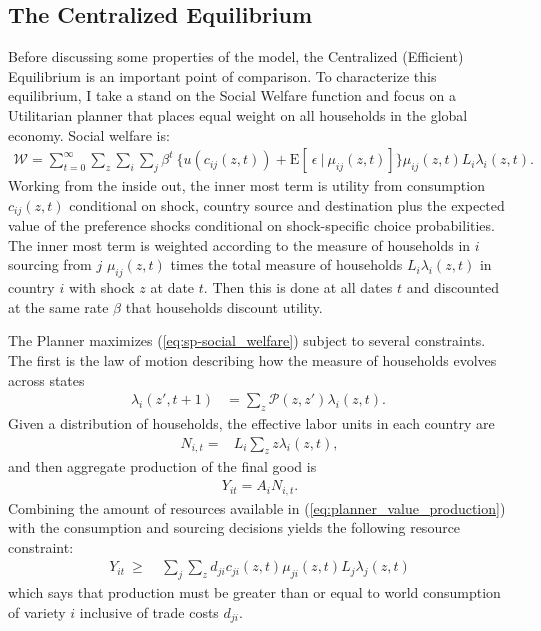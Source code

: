 \documentclass[12pt,pdftex]{article}
\begin{document}
\begin{onehalfspacing}
\subsection{The Centralized Equilibrium}

Before discussing some properties of the model, the Centralized (Efficient) Equilibrium is an important point of comparison. To characterize this equilibrium, I take a stand on the Social Welfare function and focus on a Utilitarian planner that places equal weight on all households in the global economy. Social welfare is:
\begin{align}
\mathcal{W} =\sum_{t=0}^{\infty}  \sum\limits_{z} \sum_{i} \sum_{j} \beta^{t} \  \bigg \{  u(c_{ij}(z, t) ) + \mathrm{E}[ \ \epsilon \ | \ \mu_{ij}(z,t) ] \bigg \}\mu_{ij}(z,t) L_{i} \lambda_{i}(z, t).
\label{eq:sp-social_welfare}
\end{align}
Working from the inside out, the inner most term is utility from consumption $c_{ij}(z, t)$ conditional on shock, country source and destination plus the expected value of the preference shocks conditional on shock-specific choice probabilities. The inner most term is weighted according to the measure of households in $i$ sourcing from $j$ $\mu_{ij}(z,t)$ times the total measure of households $L_{i}\lambda_{i}(z, t)$ in country $i$ with shock $z$ at date $t$. Then this is done at all dates $t$ and discounted at the same rate $\beta$ that households discount utility.

The Planner maximizes (\ref{eq:sp-social_welfare}) subject to several constraints. The first is the law of motion describing how the measure of households evolves across states
\begin{align}
\lambda_{i}(z', t+1)  & =   \sum_{z} \mathcal{P}(z, z') \lambda_{i}(z,  t).  \  \label{eq:planner_law_motion}
\end{align}
Given a distribution of households, the effective labor units in each country are
\begin{align}
N_{i,t} =&  L_i \sum_{z} z \lambda_{i}(z, t),
\label{eq:planner_labor_supply}
\end{align}
and then aggregate production of the final good is
\begin{align}
Y_{it} = A_i N_{i,t}.
\label{eq:planner_value_production}
\end{align}
Combining the amount of resources available in (\ref{eq:planner_value_production}) with the consumption and sourcing decisions yields the following resource constraint:
\begin{align}
Y_{it}\  \geq \ & \sum_{j} \sum_{z} d_{ji} c_{ji}(z, t) \mu_{ji}(z,t) L_{j}\lambda_{j}(z, t)
\label{eq:planner_rc}
\end{align}
which says that production must be greater than or equal to world consumption of variety $i$ inclusive of trade costs $d_{ji}$.


\end{onehalfspacing}
\end{document}
